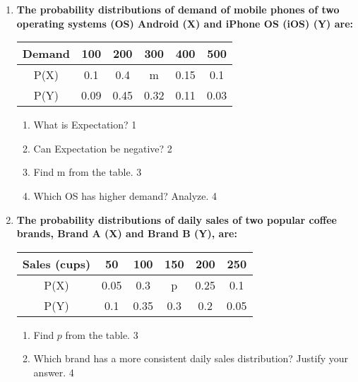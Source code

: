 \documentclass[a4paper,oneside, margin=1.4in]{book}
\begin{document}
\begin{enumerate}
  
   \item
	  \textbf{The probability distributions of demand of mobile phones of two 
	  operating systems (OS) Android (X) and iPhone OS (iOS) (Y) are:} 
	  
	    \begin{table}[h]
	    	  \begin{center}
\begin{tabular}{c|c|c|c|c|c}
Demand & 100  & 200  & 300  & 400  & 500  \\ \hline
P(X)   & 0.1  & 0.4  & m    & 0.15 & 0.1  \\ \hline
P(Y)   & 0.09 & 0.45 & 0.32 & 0.11 & 0.03
\end{tabular}
	  \end{center}
\end{table}
  
  \begin{enumerate}
    \item
	What is Expectation? \hfill 1
    \item
	Can Expectation be negative? \hfill 2
    \item  
	Find m from the table. \hfill 3
    \item
	Which OS has higher demand? Analyze. \hfill 4
  \end{enumerate}
  
  \item
	  \textbf{The probability distributions of daily sales of two popular coffee brands, Brand A (X) and Brand B (Y), are:} 
	  
	    \begin{table}[h]
	    	  \begin{center}
\begin{tabular}{c|c|c|c|c|c}
Sales (cups) & 50   & 100  & 150  & 200  & 250  \\ \hline
P(X)         & 0.05 & 0.3  & p    & 0.25 & 0.1  \\ \hline
P(Y)         & 0.1  & 0.35 & 0.3  & 0.2  & 0.05
\end{tabular}
	  \end{center}
\end{table}
  
  \begin{enumerate}
       \item  
	Find \( p \) from the table. \hfill 3
    \item
	Which brand has a more consistent daily sales distribution? Justify your answer. \hfill 4
  \end{enumerate}
  


\end{enumerate}
\end{document}
